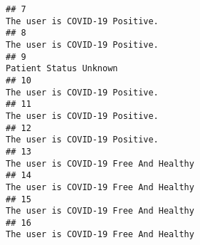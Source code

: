 \documentclass[
]{article}
\begin{document}
\begin{verbatim}
## 7                                                                                                                                                                                                                                       The user is COVID-19 Positive.
## 8                                                                                                                                                                                                                                       The user is COVID-19 Positive.
## 9                                                                                                                                                                                                                                               Patient Status Unknown
## 10                                                                                                                                                                                                                                      The user is COVID-19 Positive.
## 11                                                                                                                                                                                                                                      The user is COVID-19 Positive.
## 12                                                                                                                                                                                                                                      The user is COVID-19 Positive.
## 13                                                                                                                                                                                                                               The user is COVID-19 Free And Healthy
## 14                                                                                                                                                                                                                               The user is COVID-19 Free And Healthy
## 15                                                                                                                                                                                                                               The user is COVID-19 Free And Healthy
## 16                                                                                                                                                                                                                               The user is COVID-19 Free And Healthy

\end{verbatim}
\end{document}
